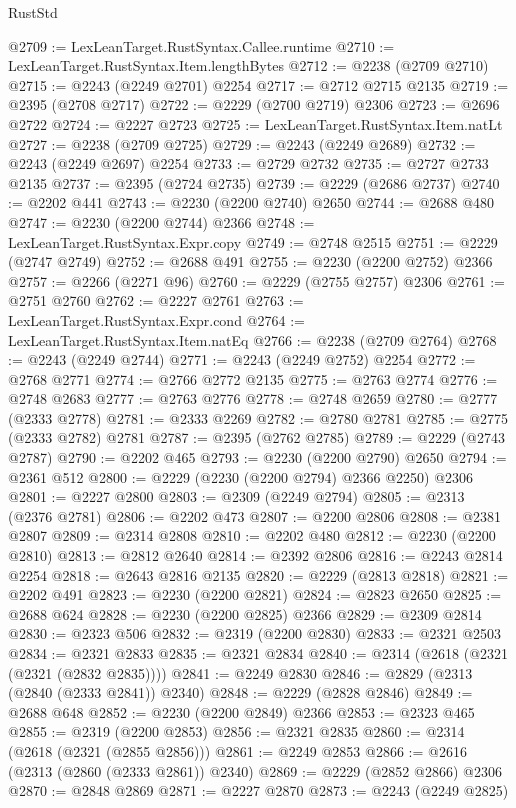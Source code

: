 \begin{lexlean}{RustStd}
\begin{coremodule}
@2709 := LexLeanTarget.RustSyntax.Callee.runtime
@2710 := LexLeanTarget.RustSyntax.Item.lengthBytes
@2712 := @2238 (@2709 @2710)
@2715 := @2243 (@2249 @2701) @2254
@2717 := @2712 @2715 @2135
@2719 := @2395 (@2708 @2717)
@2722 := @2229 (@2700 @2719) @2306
@2723 := @2696 @2722
@2724 := @2227 @2723
@2725 := LexLeanTarget.RustSyntax.Item.natLt
@2727 := @2238 (@2709 @2725)
@2729 := @2243 (@2249 @2689)
@2732 := @2243 (@2249 @2697) @2254
@2733 := @2729 @2732
@2735 := @2727 @2733 @2135
@2737 := @2395 (@2724 @2735)
@2739 := @2229 (@2686 @2737)
@2740 := @2202 @441
@2743 := @2230 (@2200 @2740) @2650
@2744 := @2688 @480
@2747 := @2230 (@2200 @2744) @2366
@2748 := LexLeanTarget.RustSyntax.Expr.copy
@2749 := @2748 @2515
@2751 := @2229 (@2747 @2749)
@2752 := @2688 @491
@2755 := @2230 (@2200 @2752) @2366
@2757 := @2266 (@2271 @96)
@2760 := @2229 (@2755 @2757) @2306
@2761 := @2751 @2760
@2762 := @2227 @2761
@2763 := LexLeanTarget.RustSyntax.Expr.cond
@2764 := LexLeanTarget.RustSyntax.Item.natEq
@2766 := @2238 (@2709 @2764)
@2768 := @2243 (@2249 @2744)
@2771 := @2243 (@2249 @2752) @2254
@2772 := @2768 @2771
@2774 := @2766 @2772 @2135
@2775 := @2763 @2774
@2776 := @2748 @2683
@2777 := @2763 @2776
@2778 := @2748 @2659
@2780 := @2777 (@2333 @2778)
@2781 := @2333 @2269
@2782 := @2780 @2781
@2785 := @2775 (@2333 @2782) @2781
@2787 := @2395 (@2762 @2785)
@2789 := @2229 (@2743 @2787)
@2790 := @2202 @465
@2793 := @2230 (@2200 @2790) @2650
@2794 := @2361 @512
@2800 := @2229 (@2230 (@2200 @2794) @2366 @2250) @2306
@2801 := @2227 @2800
@2803 := @2309 (@2249 @2794)
@2805 := @2313 (@2376 @2781)
@2806 := @2202 @473
@2807 := @2200 @2806
@2808 := @2381 @2807
@2809 := @2314 @2808
@2810 := @2202 @480
@2812 := @2230 (@2200 @2810)
@2813 := @2812 @2640
@2814 := @2392 @2806
@2816 := @2243 @2814 @2254
@2818 := @2643 @2816 @2135
@2820 := @2229 (@2813 @2818)
@2821 := @2202 @491
@2823 := @2230 (@2200 @2821)
@2824 := @2823 @2650
@2825 := @2688 @624
@2828 := @2230 (@2200 @2825) @2366
@2829 := @2309 @2814
@2830 := @2323 @506
@2832 := @2319 (@2200 @2830)
@2833 := @2321 @2503
@2834 := @2321 @2833
@2835 := @2321 @2834
@2840 := @2314 (@2618 (@2321 (@2321 (@2832 @2835))))
@2841 := @2249 @2830
@2846 := @2829 (@2313 (@2840 (@2333 @2841)) @2340)
@2848 := @2229 (@2828 @2846)
@2849 := @2688 @648
@2852 := @2230 (@2200 @2849) @2366
@2853 := @2323 @465
@2855 := @2319 (@2200 @2853)
@2856 := @2321 @2835
@2860 := @2314 (@2618 (@2321 (@2855 @2856)))
@2861 := @2249 @2853
@2866 := @2616 (@2313 (@2860 (@2333 @2861)) @2340)
@2869 := @2229 (@2852 @2866) @2306
@2870 := @2848 @2869
@2871 := @2227 @2870
@2873 := @2243 (@2249 @2825)

\end{coremodule}
\end{lexlean}
